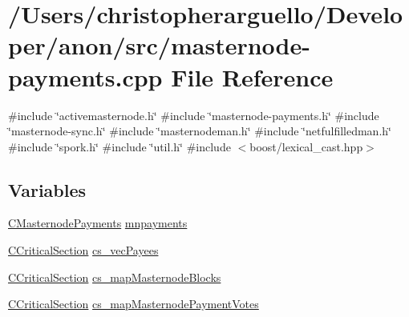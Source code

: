 \hypertarget{masternode-payments_8cpp}{}\section{/\+Users/christopherarguello/\+Developer/anon/src/masternode-\/payments.cpp File Reference}
\label{masternode-payments_8cpp}
{\ttfamily \#include \char`\"{}activemasternode.\+h\char`\"{}}\newline
{\ttfamily \#include \char`\"{}masternode-\/payments.\+h\char`\"{}}\newline
{\ttfamily \#include \char`\"{}masternode-\/sync.\+h\char`\"{}}\newline
{\ttfamily \#include \char`\"{}masternodeman.\+h\char`\"{}}\newline
{\ttfamily \#include \char`\"{}netfulfilledman.\+h\char`\"{}}\newline
{\ttfamily \#include \char`\"{}spork.\+h\char`\"{}}\newline
{\ttfamily \#include \char`\"{}util.\+h\char`\"{}}\newline
{\ttfamily \#include $<$boost/lexical\+\_\+cast.\+hpp$>$}\newline
\subsection*{Variables}
\begin{DoxyCompactItemize}
\item 
\mbox{\hyperlink{class_c_masternode_payments}{C\+Masternode\+Payments}} \mbox{\hyperlink{masternode-payments_8cpp_ab15235ecb957ac017b2a372923b90765}{mnpayments}}
\item 
\mbox{\hyperlink{sync_8h_a37a4692b2d517f2843655ca11af7668a}{C\+Critical\+Section}} \mbox{\hyperlink{masternode-payments_8cpp_a51764240f42529c755c09fbbcf6203c4}{cs\+\_\+vec\+Payees}}
\item 
\mbox{\hyperlink{sync_8h_a37a4692b2d517f2843655ca11af7668a}{C\+Critical\+Section}} \mbox{\hyperlink{masternode-payments_8cpp_aac327e3a251800c22ec67bfa9534c838}{cs\+\_\+map\+Masternode\+Blocks}}
\item 
\mbox{\hyperlink{sync_8h_a37a4692b2d517f2843655ca11af7668a}{C\+Critical\+Section}} \mbox{\hyperlink{masternode-payments_8cpp_ad2eae6705b6de2f723b1aa116ab5c5c8}{cs\+\_\+map\+Masternode\+Payment\+Votes}}
\end{DoxyCompactItemize}


